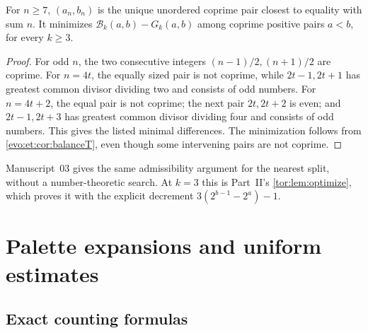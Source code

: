 \documentclass[11pt,a4paper]{article}
\numberwithin{equation}{section}
\theoremstyle{definition}
\theoremstyle{remark}
\newcommand{\Bip}{\mathcal B}
\begin{document}
\begin{lemma}\label{evo:et:lem:coprime}
For $n\ge7$, $(a_n,b_n)$ is the unique unordered coprime pair closest to
equality with sum $n$. It minimizes $\Bip_k(a,b)-G_k(a,b)$ among coprime
positive pairs $a<b$, for every $k\ge3$.
\end{lemma}
\begin{proof}
For odd $n$, the two consecutive integers $(n-1)/2,(n+1)/2$ are coprime. For
$n=4t$, the equally sized pair is not coprime, while $2t-1,2t+1$ has greatest
common divisor dividing two and consists of odd numbers. For $n=4t+2$, the
equal pair is not coprime; the next pair $2t,2t+2$ is even; and $2t-1,2t+3$
has greatest common divisor dividing four and consists of odd numbers. This
gives the listed minimal differences. The minimization follows from
\cref{evo:et:cor:balanceT}, even though some intervening pairs are not
coprime.
\end{proof}

Manuscript~03 gives the same admissibility argument for the nearest split,
without a number-theoretic search. At $k=3$ this is Part~II's
\cref{tor:lem:optimize}, which proves it with the
explicit decrement $3(2^{b-1}-2^a)-1$.

\section{Palette expansions and uniform estimates}\label{evo:sec:palettes}

\subsection{Exact counting formulas}
\end{document}
